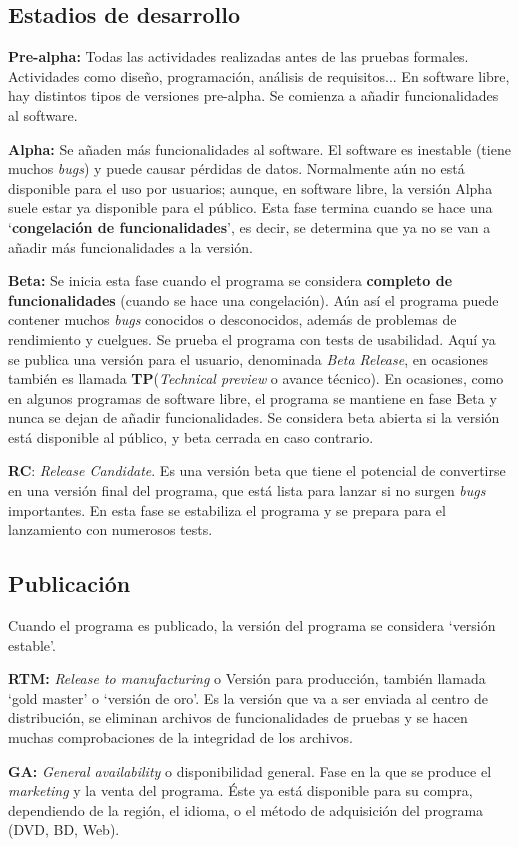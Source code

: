 \documentclass[a4paper, 11pt]{report} %
\begin{document}
\subsection{Estadios de desarrollo}
\begin{description}
\item \textbf{Pre-alpha:} Todas las actividades realizadas antes de las pruebas formales. Actividades como diseño, programación, análisis de requisitos... En software libre, hay distintos tipos de versiones pre-alpha. Se comienza a añadir funcionalidades al software.
\item \textbf{Alpha:} Se añaden más funcionalidades al software. El software es inestable (tiene muchos \textit{bugs}) y puede causar pérdidas de datos. Normalmente aún no está disponible para el uso por usuarios; aunque, en software libre, la versión Alpha suele estar ya disponible para el público. Esta fase termina cuando se hace una `\textbf{congelación de funcionalidades}', es decir, se determina que ya no se van a añadir más funcionalidades a la versión.
\item \textbf{Beta:} Se inicia esta fase cuando el programa se considera \textbf{completo de funcionalidades} (cuando se hace una congelación). Aún así el programa puede contener muchos \textit{bugs} conocidos o desconocidos, además de problemas de rendimiento y cuelgues. Se prueba el programa con tests de usabilidad.
Aquí ya se publica una versión para el usuario, denominada \textit{Beta Release}, en ocasiones también es llamada \textbf{TP}(\textit{Technical preview} o avance técnico). En ocasiones, como en algunos programas de software libre, el programa se mantiene en fase Beta y nunca se dejan de añadir funcionalidades. Se considera beta abierta si la versión está disponible al público, y beta cerrada en caso contrario.
\item \textbf{RC}: \textit{Release Candidate}. Es una versión beta que tiene el potencial de convertirse en una versión final del programa, que está lista para lanzar si no surgen \textit{bugs} importantes. En esta fase se estabiliza el programa y se prepara para el lanzamiento con numerosos tests.
\end{description}

\newpage
\subsection{Publicación}
Cuando el programa es publicado, la versión del programa se considera `versión estable'.
\begin{description}
\item \textbf{RTM:} \textit{Release to manufacturing} o Versión para producción, también llamada `gold master' o `versión de oro'.  Es la versión que va a ser enviada al centro de distribución, se eliminan archivos de funcionalidades de pruebas y se hacen muchas comprobaciones de la integridad de los archivos.
\item \textbf{GA:} \textit{General availability} o disponibilidad general. Fase en la que se produce el \textit{marketing} y la venta del programa. Éste ya está disponible para su compra, dependiendo de la región, el idioma, o el método de adquisición del programa (DVD, BD, Web).
\end{description}
\end{document}
